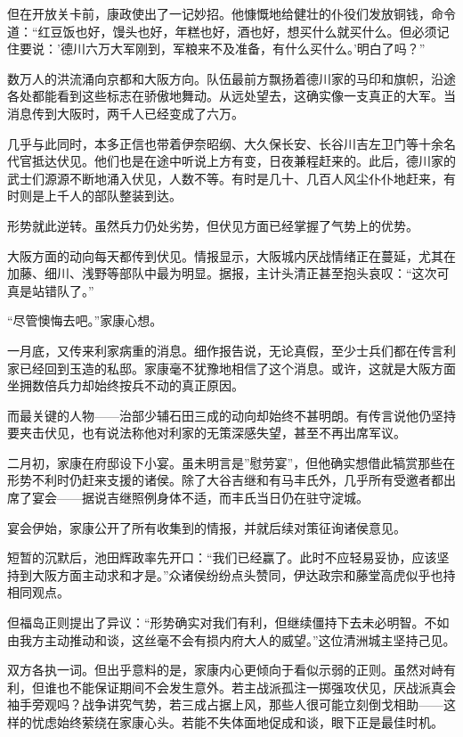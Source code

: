 \documentclass[
]{article}
\begin{document}
但在开放关卡前，康政使出了一记妙招。他慷慨地给健壮的仆役们发放铜钱，命令道：``红豆饭也好，馒头也好，年糕也好，酒也好，想买什么就买什么。但必须记住要说：'德川六万大军刚到，军粮来不及准备，有什么买什么。'明白了吗？''

数万人的洪流涌向京都和大阪方向。队伍最前方飘扬着德川家的马印和旗帜，沿途各处都能看到这些标志在骄傲地舞动。从远处望去，这确实像一支真正的大军。当消息传到大阪时，两千人已经变成了六万。

几乎与此同时，本多正信也带着伊奈昭纲、大久保长安、长谷川吉左卫门等十余名代官抵达伏见。他们也是在途中听说上方有变，日夜兼程赶来的。此后，德川家的武士们源源不断地涌入伏见，人数不等。有时是几十、几百人风尘仆仆地赶来，有时则是上千人的部队整装到达。

形势就此逆转。虽然兵力仍处劣势，但伏见方面已经掌握了气势上的优势。

大阪方面的动向每天都传到伏见。情报显示，大阪城内厌战情绪正在蔓延，尤其在加藤、细川、浅野等部队中最为明显。据报，主计头清正甚至抱头哀叹：``这次可真是站错队了。''

``尽管懊悔去吧。''家康心想。

一月底，又传来利家病重的消息。细作报告说，无论真假，至少士兵们都在传言利家已经回到玉造的私邸。家康毫不犹豫地相信了这个消息。或许，这就是大阪方面坐拥数倍兵力却始终按兵不动的真正原因。

而最关键的人物------治部少辅石田三成的动向却始终不甚明朗。有传言说他仍坚持要夹击伏见，也有说法称他对利家的无策深感失望，甚至不再出席军议。

二月初，家康在府邸设下小宴。虽未明言是''慰劳宴''，但他确实想借此犒赏那些在形势不利时仍赶来支援的诸侯。除了大谷吉继和有马丰氏外，几乎所有受邀者都出席了宴会------据说吉继照例身体不适，而丰氏当日仍在驻守淀城。

宴会伊始，家康公开了所有收集到的情报，并就后续对策征询诸侯意见。

短暂的沉默后，池田辉政率先开口：``我们已经赢了。此时不应轻易妥协，应该坚持到大阪方面主动求和才是。''众诸侯纷纷点头赞同，伊达政宗和藤堂高虎似乎也持相同观点。

但福岛正则提出了异议：``形势确实对我们有利，但继续僵持下去未必明智。不如由我方主动推动和谈，这丝毫不会有损内府大人的威望。''这位清洲城主坚持己见。

双方各执一词。但出乎意料的是，家康内心更倾向于看似示弱的正则。虽然对峙有利，但谁也不能保证期间不会发生意外。若主战派孤注一掷强攻伏见，厌战派真会袖手旁观吗？战争讲究气势，若三成占据上风，那些人很可能立刻倒戈相助------这样的忧虑始终萦绕在家康心头。若能不失体面地促成和谈，眼下正是最佳时机。
\end{document}

